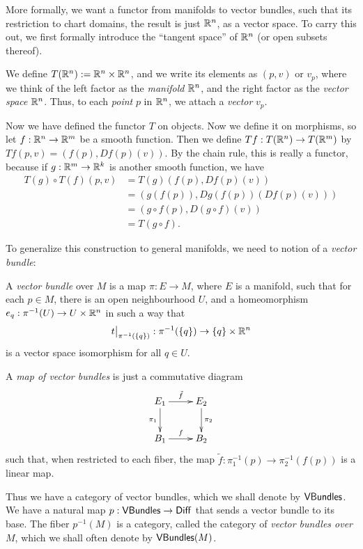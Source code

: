 \documentclass[11pt, english]{article}
\begin{document}
More formally, we want a functor from manifolds to vector bundles, such that its restriction to chart domains, the result is just $\mathbb{R}^n$, as a vector space. To carry this out, we first formally introduce the ``tangent space'' of $\mathbb{R}^n$ (or open subsets thereof).

We define $T(\mathbb{R}^n) := \mathbb{R}^n \times \mathbb{R}^n$, and we write its elements as $(p,v)$ or $v_p$, where we think of the left factor as the \emph{manifold} $\mathbb{R}^n$, and the right factor as the \emph{vector space} $\mathbb{R}^n$. Thus, to each \emph{point} $p$ in $\mathbb{R}^n$, we attach a \emph{vector} $v_p$.

Now we have defined the functor $T$ on objects. Now we define it on morphisms, so let $f:\mathbb{R}^n \to \mathbb{R}^m$ be a smooth function. Then we define $Tf:T(\mathbb{R}^n) \to T(\mathbb{R}^m)$ by $Tf(p,v)=(f(p),Df(p)(v))$. By the chain rule, this is really a functor, because if $g:\mathbb{R}^m \to \mathbb{R}^k$ is another smooth function, we have
\begin{align*}
T(g) \circ T(f) (p,v) &= T(g)(f(p),Df(p)(v)) \\
&= \left( g(f(p)) , Dg(f(p))(Df(p)(v))\right) \\
&= \left( g \circ f (p) , D(g \circ f)(v)   \right) \\
&= T(g \circ f).
\end{align*}

To generalize this construction to general manifolds, we need to notion of a \emph{vector bundle}:

\begin{defi}
  A \emph{vector bundle} over $M$ is a map $\pi:E \to M$, where $E$ is a manifold, such that for each $p \in M$, there is an open neighbourhood $U$, and a homeomorphism $e_q:\pi^{-1}(U) \to U \times \mathbb{R}^n$ in such a way that \[\restr{t}{\pi^{-1}(\{q\})}:\pi^{-1}(\{q\}) \to \{q \} \times \R^n\] is a vector space isomorphism for all $q \in U$.

A \emph{map of vector bundles} is just a commutative diagram
\[
\xymatrix{
E_1 \ar[d]_{\pi_1}  \ar[r]^{\tilde f} & E_2 \ar[d]^{\pi_2} \\
B_1 \ar[r]^f  & B_2
}
\]
such that, when restricted to each fiber, the map $\tilde f:\pi_1^{-1}(p) \to \pi_2^{-1}(f(p))$ is a linear map.
\end{defi}

Thus we have a category of vector bundles, which we shall denote by $\mathsf{VBundles}$. We have a natural map $p:\mathsf{VBundles} \to \mathsf{Diff}$ that sends a vector bundle to its base. The fiber $p^{-1}(M)$ is a category, called the category of \emph{vector bundles over $M$}, which we shall often denote by $\mathsf{VBundles}(M)$.
\end{document}
